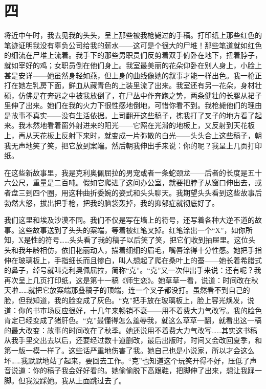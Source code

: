 \section*{四} 

将近中午时，我去见我的头头，呈上那些被我枪毙过的手稿。打印纸上那些红色的笔迹证明我没有辜负公司给我的薪水——这可是个很大的尸堆！那些笔道就如红色的细流在尸堆上流着。我手下的那些男职员们反剪着双手俯卧在地下，扭着脖子，就如宰好的鸡；女职员倒在他们身上。我室最美丽的花朵仰卧在别人身上，小脸上甚是安详——她虽然身轻如燕，但上身的曲线像她的叙事才能一样出色。我一枪正打在她左乳房下面，鲜血从藏青色的上装里流了出来。我室还有另一花朵，身材壮硕，仿佛是在奔逃之中被我放倒了，在尸丛中作奔跑之势，两条健壮的长腿从裙子里伸了出来。她们在我的火力下很性感地倒地，可惜你看不到。我枪毙他们的理由是故事不真实——没有生活依据。上司翻开这些稿子，拣我打了叉子的地方看了起来。我木然地看着窗外射进来的阳光——它照在光滑的地板上，又反射到天花板上，再从天花板上反射下来时，就变成一片弥散的白光——头头合上这些稿子，朝我无声地笑了笑，把它放到案端。然后朝我伸出手来说：你的呢？我呈上几页打印纸。 

在这些新故事里，我是克利奥佩屈拉的男宠或者一条蛇颈龙——后者的长度是五十六公尺，重量是二百吨。假如它爬进了这间办公室，就要把脖子从窗口伸出去，或者盘三到四个圈，用这种曲折委婉的姿式和头头聊天。我期望头头看到这些故事后勃然大怒，拔出把手枪，把我的脑袋轰掉，我的抑郁症就彻底好了。 

我们这里和埃及沙漠不同。我们不仅是写在墙上的符号，还写着各种大逆不道的故事。这些故事送到了头头的案端，等着被红笔叉掉。红笔涂出一个“X”，如你所知，X是性的符号……头头看了我的稿子以后笑了笑，把它们收到抽屉里。这位头头和我年龄相仿，依旧艳丽动人，描着细细的眉毛，嘴唇涂得十分性感。她把手指伸在玻璃板上，手指细长而且惨白，叫人想起了爬在桑叶上的蚕——她长着希腊式的鼻子，绰号就叫克利奥佩屈拉，简称“克”。“克”又一次伸出手来说：还有呢？我再次呈上几页打印纸，这是第十一稿《师生恋》。她草草一看，说道：时间改在秋天啦……就把它放案端那叠稿子的顶端，连一个叉子都没打。虽然看不到自己的脸，但我知道，我的脸变成了灰色。“克”把手放在玻璃板上，脸上容光焕发，说道：你的书市场反应很好，十几年来畅销不衰——用不着费大力气改写。我的脸色肯定已经变成了猪肝色。“克”最懂得怎么羞辱我，就这么草草一翻，就看出这一稿的最大改变：故事的时间改在了秋季。她还说用不着费大力气改写……其实这书稿从我手里交出去以后，还要经过数十道删改，最后出版时，时间又会改回夏季，和第一版一模一样了。这些话严重地伤害了我。她自己也是小说家，所以才会这么坏……我默默地站了起来，要回去工作。“克”也知道这个玩笑开得不好，压低了声音说道：你的稿子我会好好看的。她偷偷脱下高跟鞋，把脚伸了出来，想让我踩一脚。但我没踩她。我从上面跳过去了。 


